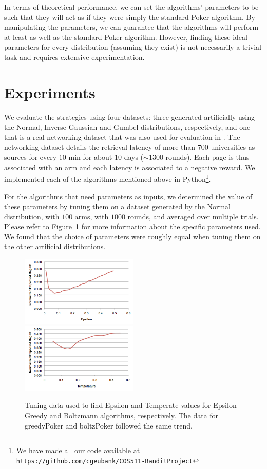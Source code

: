 \documentclass[12pt]{article}
\begin{document}
In terms of theoretical performance, we can set the algorithms' parameters to be such that they will act as if they were simply the standard Poker algorithm. By manipulating the parameters, we can guarantee that the algorithms will perform at least as well as the standard Poker algorithm. However, finding these ideal parameters for every distribution (assuming they exist) is not necessarily a trivial task and requires extensive experimentation.

\section{Experiments}

We evaluate the strategies using four datasets: three generated artificially using the Normal, Inverse-Gaussian and Gumbel distributions, respectively,
and one that is a real networking dataset that was also used for evaluation in \cite{Mohri}.  The networking dataset details the retrieval latency of more than $700$
universities as sources for every $10$ min for about $10$ days ($\sim 1300$ rounds).  Each page is thus associated with an arm and each latency is associated to a negative reward.
We implemented each of the algorithms mentioned above in Python\footnote{We have made all our code available at \texttt{https://github.com/cgeubank/COS511-BanditProject}}. 

For the algorithms that need parameters as inputs, we determined the value of these parameters by tuning them on a dataset generated by the Normal distribution, with $100$ arms,
with $1000$ rounds, and averaged over multiple trials.  Please refer to Figure~\ref{fig:tuning} for more information about the specific parameters used.  We found that the choice of parameters
were roughly equal when tuning them on the other artificial distributions.

\begin{figure}
\includegraphics[width=0.5\textwidth]{EpsilonTuning}
\hfill
\includegraphics[width=0.5\textwidth]{TempTuning}
\caption{Tuning data used to find Epsilon and Temperate values for Epsilon-Greedy and Boltzmann algorithms, respectively.  The data for greedyPoker and boltzPoker followed
the same trend.}
\label{fig:tuning}
\end{figure}
\end{document}
